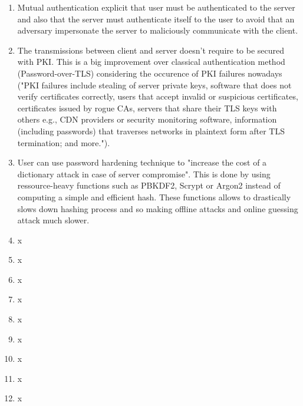 \documentclass[../report.tex]{subfiles}
\begin{document}
\begin{enumerate}
 \item Mutual authentication explicit that user must be authenticated to the server and also that the server must authenticate itself to the user to avoid that an adversary impersonate the server to maliciously communicate with the client.
 \item The transmissions between client and server doesn't require to be secured with PKI. This is a big improvement over classical authentication method (Password-over-TLS) considering the occurence of PKI failures nowadays ("PKI failures include stealing of server private keys, software that does not verify certificates correctly, users that accept invalid or suspicious certificates, certificates issued by rogue CAs, servers that share their TLS keys with others e.g., CDN providers or security monitoring software, information (including passwords) that traverses networks in plaintext form after TLS termination; and more.").
 \item User can use password hardening technique to "increase the cost of a dictionary attack in case of server compromise". This is done by using ressource-heavy functions such as PBKDF2, Scrypt or Argon2 instead of computing a simple and efficient hash. These functions allows to drastically slows down hashing process and so making offline attacks and online guessing attack much slower.
 \item x
 \item x
 \item x
 \item x
 \item x
 \item x
 \item x
 \item x
 \item x
\end{enumerate}
\end{document}
